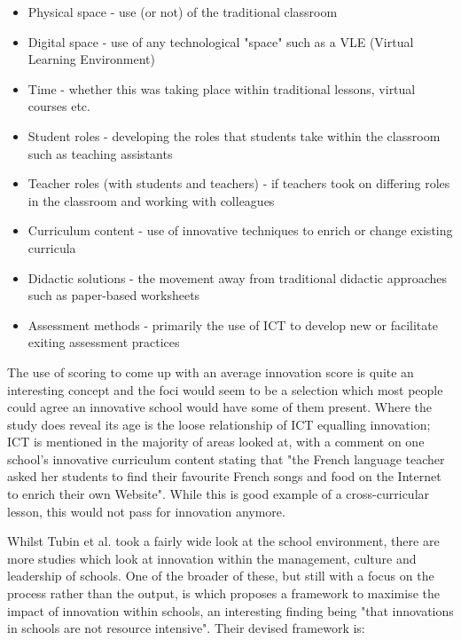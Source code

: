 \begin{itemize}
\item Physical space - use (or not) of the traditional classroom
\item Digital space - use of any technological "space" such as a VLE (Virtual Learning Environment)
\item Time - whether this was taking place within traditional lessons, virtual courses etc.
\item Student roles - developing the roles that students take within the classroom such as teaching assistants
\item Teacher roles (with students and teachers) - if teachers took on differing roles in the classroom and working with colleagues
\item Curriculum content - use of innovative techniques to enrich or change existing curricula
\item Didactic solutions - the movement away from traditional didactic approaches such as paper-based worksheets
\item Assessment methods - primarily the use of ICT to develop new or facilitate exiting assessment practices
\end{itemize}

The use of scoring to come up with an average innovation score is quite an interesting concept and the foci would seem to be a selection which most people could agree an innovative school would have some of them present. Where the study does reveal its age is the loose relationship of ICT equalling innovation; ICT is mentioned in the majority of areas looked at, with a comment on one school's innovative curriculum content stating that "the French language teacher asked her students to find their favourite French songs and food on the Internet to enrich their own Website". While this is good example of a cross-curricular lesson, this would not pass for innovation anymore.

Whilst Tubin et al. took a fairly wide look at the school environment, there are more studies which look at innovation within the management, culture and leadership of schools. One of the broader of these, but still with a focus on the process rather than the output, is \citet{Sharma_2005} which proposes a framework to maximise the impact of innovation within schools, an interesting finding being "that innovations in schools are not resource intensive". Their devised framework is:

